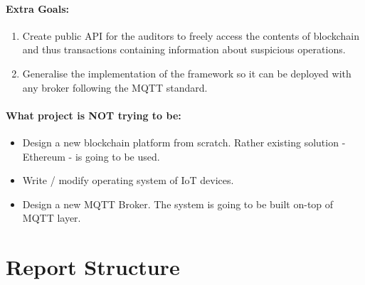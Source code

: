 \paragraph{Extra Goals:}
\begin{enumerate}
  \item Create public API for the auditors to freely access the contents of blockchain and thus transactions containing information about suspicious operations.
  \item Generalise the implementation of the framework so it can be deployed with any broker following the MQTT standard.
\end{enumerate}

\paragraph{What project is NOT trying to be:}
\begin{itemize}
  \item Design a new blockchain platform from scratch. Rather existing solution - Ethereum - is going to be used.
  \item Write / modify operating system of IoT devices.
  \item Design a new MQTT Broker. The system is going to be built on-top of MQTT layer.
\end{itemize}

\section{Report Structure}

